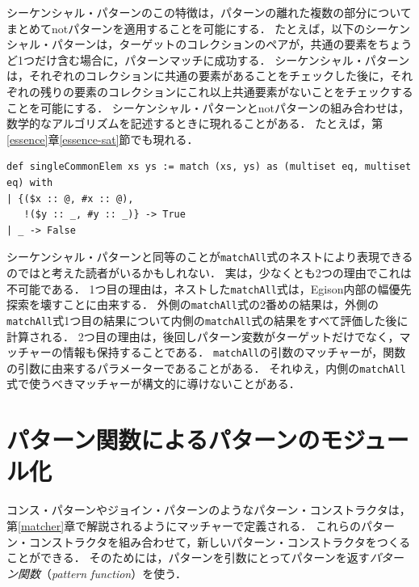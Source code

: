 シーケンシャル・パターンのこの特徴は，パターンの離れた複数の部分についてまとめてnotパターンを適用することを可能にする．
たとえば，以下のシーケンシャル・パターンは，ターゲットのコレクションのペアが，共通の要素をちょうど1つだけ含む場合に，パターンマッチに成功する．
シーケンシャル・パターンは，それぞれのコレクションに共通の要素があることをチェックした後に，それぞれの残りの要素のコレクションにこれ以上共通要素がないことをチェックすることを可能にする．
シーケンシャル・パターンとnotパターンの組み合わせは，数学的なアルゴリズムを記述するときに現れることがある．
たとえば，第\ref{essence}章\ref{essence-sat}節でも現れる．
\begin{lstlisting}[language=egison,numbers=none]
def singleCommonElem xs ys := match (xs, ys) as (multiset eq, multiset eq) with
| {($x :: @, #x :: @),
   !($y :: _, #y :: _)} -> True
| _ -> False
\end{lstlisting}

シーケンシャル・パターンと同等のことが\lstinline{matchAll}式のネストにより表現できるのではと考えた読者がいるかもしれない．
実は，少なくとも2つの理由でこれは不可能である．
1つ目の理由は，ネストした\lstinline{matchAll}式は，Egison内部の幅優先探索を壊すことに由来する．
外側の\lstinline{matchAll}式の2番めの結果は，外側の\lstinline{matchAll}式1つ目の結果について内側の\lstinline{matchAll}式の結果をすべて評価した後に計算される．
2つ目の理由は，後回しパターン変数がターゲットだけでなく，マッチャーの情報も保持することである．
\lstinline{matchAll}の引数のマッチャーが，関数の引数に由来するパラメーターであることがある．
それゆえ，内側の\lstinline{matchAll}式で使うべきマッチャーが構文的に導けないことがある．


\section{パターン関数によるパターンのモジュール化}\label{quick-pat-fun}

コンス・パターンやジョイン・パターンのようなパターン・コンストラクタは，第\ref{matcher}章で解説されるようにマッチャーで定義される．
これらのパターン・コンストラクタを組み合わせて，新しいパターン・コンストラクタをつくることができる．
そのためには，パターンを引数にとってパターンを返す\emph{パターン関数}（\emph{pattern function}）を使う．


